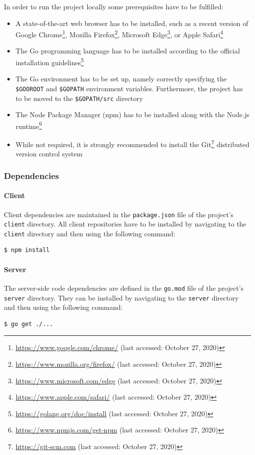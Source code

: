 In order to run the project locally some prerequisites have to be fulfilled:
\begin{itemize}
    \item A state-of-the-art web browser has to be installed, such as a recent version of Google Chrome\footnote{\url{https://www.google.com/chrome/} (last accessed: October 27, 2020)}, Mozilla Firefox\footnote{\url{https://www.mozilla.org/firefox/} (last accessed: October 27, 2020)}, Microsoft Edge\footnote{\url{https://www.microsoft.com/edge} (last accessed: October 27, 2020)}, or Apple Safari\footnote{\url{https://www.apple.com/safari/} (last accessed: October 27, 2020)}
    \item The Go programming language has to be installed according to the official installation guidelines\footnote{\url{https://golang.org/doc/install} (last accessed: October 27, 2020)}
    \item The Go environment has to be set up, namely correctly specifying the \texttt{\$GOOROOT} and \texttt{\$GOPATH} environment variables. Furthermore, the project has to be moved to the \texttt{\$GOPATH/src} directory
    \item The Node Package Manager (npm) has to be installed along with the Node.js runtime\footnote{\url{https://www.npmjs.com/get-npm} (last accessed: October 27, 2020)}
    \item While not required, it is strongly recommended to install the Git\footnote{\url{https://git-scm.com} (last accessed: October 27, 2020)} distributed version control system 
\end{itemize}

\subsubsection{Dependencies}
\label{subsub:dependencies}

\paragraph{Client}
Client dependencies are maintained in the \texttt{package.json} file of the project's \texttt{client} directory. All client repositories have to be installed by navigating to the \texttt{client} directory and then using the following command:
\begin{verbatim}
$ npm install
\end{verbatim}

\paragraph{Server}
The server-side code dependencies are defined in the \texttt{go.mod} file of the project's \texttt{server} directory. They can be installed by navigating to the \texttt{server} directory and then using the following command:
\begin{verbatim}
$ go get ./...
\end{verbatim}

